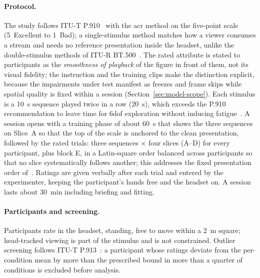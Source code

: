 \paragraph{Protocol.}
The study follows ITU-T P.910~\cite{p910} with the \gls{acr} method on
the five-point scale (5~Excellent to 1~Bad); a single-stimulus method
matches how a viewer consumes a stream and needs no reference
presentation inside the headset, unlike the double-stimulus methods of
ITU-R BT.500~\cite{bt500}. The rated attribute is
stated to participants as the \emph{smoothness of playback} of the
figure in front of them, not its visual fidelity; the instruction and
the training clips make the distinction explicit, because the
impairments under test manifest as freezes and frame skips while
spatial quality is fixed within a session
(Section~\ref{sec:model-scope}). Each stimulus is a
\SI{10}{\second} sequence played twice in a row (\SI{20}{\second}),
which exceeds the P.910 recommendation to leave time for \gls{6dof}
exploration without inducing fatigue~\cite{mosaic2026}. A session
opens with a training phase of about \SI{60}{\second} that shows the
three sequences on Slice~A so that the top of the scale is anchored
to the clean presentation, followed by the rated trials: three
sequences $\times$ four slices (A--D) for every participant, plus
block E, in a Latin-square order balanced across participants
so that no slice systematically follows another; this addresses the
fixed presentation order of~\cite{mosaic2026}. Ratings are given
verbally after each trial and entered by the experimenter, keeping
the participant's hands free and the headset on. A session lasts
about \SI{30}{\minute} including briefing and fitting.

\paragraph{Participants and screening.}
 Participants rate in the
headset, standing, free to move within a \SI{2}{\metre} square;
head-tracked viewing is part of the stimulus and is not constrained.
Outlier screening follows ITU-T P.913~\cite{p913}: a participant whose
ratings deviate from the per-condition mean by more than the
prescribed bound in more than a quarter of conditions is excluded
before analysis.

